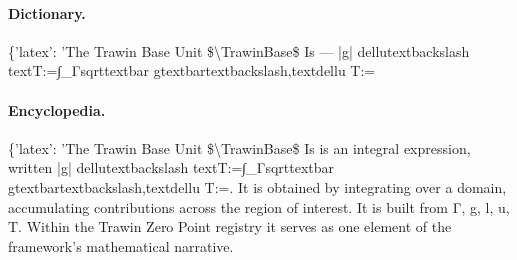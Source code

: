 \paragraph{Dictionary.}
\{'latex': 'The Trawin Base Unit \$\textbackslash{}TrawinBase\$ Is — |g| dellutextbackslash textT:=∫\_Γsqrttextbar gtextbartextbackslash,textdellu T:=

\paragraph{Encyclopedia.}
\{'latex': 'The Trawin Base Unit \$\textbackslash{}TrawinBase\$ Is is an integral expression, written |g| dellutextbackslash textT:=∫\_Γsqrttextbar gtextbartextbackslash,textdellu T:=. It is obtained by integrating over a domain, accumulating contributions across the region of interest. It is built from Γ, g, l, u, T. Within the Trawin Zero Point registry it serves as one element of the framework's mathematical narrative.
